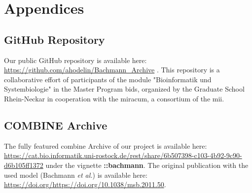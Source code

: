 \newpage
\section*{Appendices}

\subsection*{GitHub Repository} \label{git}

Our public GitHub repository is available here: \url{https://github.com/ahodelin/Bachmann_Archive} \cite{AbelHodelinHernandez.2021}.
This repository is a collaborative effort of participants of the module "Bioinformatik und Systembiologie" in the Master Program \ac{bids}, organized by the Graduate School Rhein-Neckar in cooperation with the \ac{miracum}, a consortium of the \ac{mii}.

\subsection*{COMBINE Archive}

The fully featured \ac{combine} Archive of our project is available here: \url{https://cat.bio.informatik.uni-rostock.de/rest/share/6b507398-c103-4b92-9c90-d6b105ff1372} under the vignette  \textbf{::bachmann}. The original publication with the used model (Bachmann \textit{et al.}) is available here: \url{https://doi.org/https://doi.org/10.1038/msb.2011.50}.